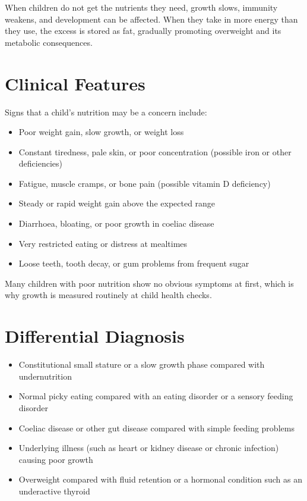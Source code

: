 When children do not get the nutrients they need, growth slows, immunity weakens, and development can be affected. When they take in more energy than they use, the excess is stored as fat, gradually promoting overweight and its metabolic consequences.

\section*{Clinical Features}
Signs that a child's nutrition may be a concern include:

\begin{itemize}
    \item Poor weight gain, slow growth, or weight loss
    \item Constant tiredness, pale skin, or poor concentration (possible iron or other deficiencies)
    \item Fatigue, muscle cramps, or bone pain (possible vitamin D deficiency)
    \item Steady or rapid weight gain above the expected range
    \item Diarrhoea, bloating, or poor growth in coeliac disease
    \item Very restricted eating or distress at mealtimes
    \item Loose teeth, tooth decay, or gum problems from frequent sugar
\end{itemize}

Many children with poor nutrition show no obvious symptoms at first, which is why growth is measured routinely at child health checks.

\section*{Differential Diagnosis}
\begin{itemize}
    \item Constitutional small stature or a slow growth phase compared with undernutrition
    \item Normal picky eating compared with an eating disorder or a sensory feeding disorder
    \item Coeliac disease or other gut disease compared with simple feeding problems
    \item Underlying illness (such as heart or kidney disease or chronic infection) causing poor growth
    \item Overweight compared with fluid retention or a hormonal condition such as an underactive thyroid
\end{itemize}


